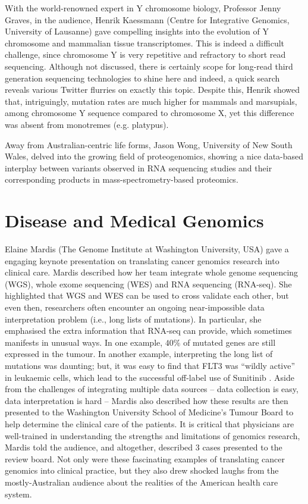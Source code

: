 \documentclass[twocolumn]{bmcart}%
\begin{document}
With the world-renowned expert in Y chromosome biology, Professor Jenny Graves, in the audience, Henrik Kaessmann (Centre for Integrative Genomics, University of Lausanne) gave compelling insights into the evolution of Y chromosome and mammalian tissue transcriptomes.  This is indeed a difficult challenge, since chromosome Y is very repetitive and refractory to short read sequencing. Although not discussed, there is certainly scope for long-read third generation sequencing technologies to shine here and indeed, a quick search reveals various Twitter flurries on exactly this topic.  Despite this, Henrik showed that, intriguingly, mutation rates are much higher for mammals and marsupials, among chromosome Y sequence compared to chromosome X, yet this difference was absent from monotremes (e.g. platypus).

Away from Australian-centric life forms, Jason Wong, University of New South Wales, delved into the growing field of proteogenomics, showing a nice data-based interplay between variants observed in RNA sequencing studies and their corresponding products in mass-spectrometry-based proteomics.



\section*{Disease and Medical Genomics}
Elaine Mardis (The Genome Institute at Washington University, USA) gave a engaging keynote presentation on translating cancer genomics research into clinical care. Mardis described how her team integrate whole genome sequencing (WGS), whole exome sequencing (WES) and RNA sequencing (RNA-seq).  She highlighted that WGS and WES can be used to cross validate each other, but even then, researchers often encounter an ongoing near-impossible data interpretation problem (i.e., long lists of mutations).  In particular, she emphasised the extra information that RNA-seq can provide, which sometimes manifests in unusual ways.  In one example, $40\%$ of mutated genes are still expressed in the tumour.  In another example, interpreting the long list of mutations was daunting; but, it was easy to find that FLT3 was ``wildly active'' in leukaemic cells, which lead to the successful off-label use of Sunitinib \cite{NYTIMES}.  Aside from the challenges of integrating multiple data sources -- data collection is easy, data interpretation is hard -- Mardis also described how these results are then presented to the Washington University School of Medicine's Tumour Board to help determine the clinical care of the patients. It is critical that physicians are well-trained in understanding the strengths and limitations of genomics research, Mardis told the audience, and altogether, described 3 cases presented to the review board. Not only were these fascinating examples of translating cancer genomics into clinical practice, but they also drew shocked laughs from the mostly-Australian audience about the realities of the American health care system. 
\end{document}
